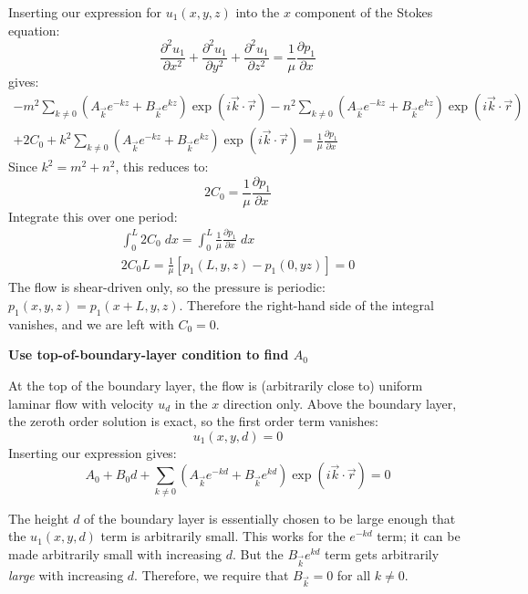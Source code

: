 \documentclass[12pt, a4paper, twoside, openright]{book}
\begin{document}
Inserting our expression for $u_1(x,y,z)$ into the $x$ component of the Stokes equation:
\begin{equation}
\frac{\partial^2 u_1}{\partial x^2} + \frac{\partial^2 u_1}{\partial y^2} +
\frac{\partial^2 u_1}{\partial z^2} =
\frac{1}{\mu} \frac{\partial p_1}{\partial x}
\end{equation}
gives:
\begin{multline}
- m^2
\sum_{k \neq 0} 
\left(  A_{\vec{k}} e^{-kz} + B_{\vec{k}} e^{kz} \right)
\exp(i \vec{k}\cdot \vec{r})
- n^2
\sum_{k \neq 0} 
\left(  A_{\vec{k}} e^{-kz} + B_{\vec{k}} e^{kz} \right)
\exp(i \vec{k}\cdot \vec{r}) \\
+ 2 C_0
+ k^2
\sum_{k \neq 0} 
\left(  A_{\vec{k}} e^{-kz} + B_{\vec{k}} e^{kz} \right)
\exp(i \vec{k}\cdot \vec{r})
= \frac{1}{\mu} \frac{\partial p_1}{\partial x}
\end{multline}
Since $k^2 = m^2 + n^2$, this reduces to:
\begin{equation}
2 C_0 = \frac{1}{\mu} \frac{\partial p_1}{\partial x}
\end{equation}
Integrate this over one period:
\begin{gather}
\int_0^L 2 C_0 \;dx = \int_0^L \frac{1}{\mu} \frac{\partial p_1}{\partial x} \;dx \\
2 C_0 L = \frac{1}{\mu} [ p_1(L,y,z) - p_1(0,yz) ] = 0
\end{gather}
The flow is shear-driven only, so the pressure is periodic: $p_1(x,y,z) = p_1(x+L,y,z)$.  Therefore the right-hand side of the integral vanishes, and we are left with $C_0 = 0$.

\vspace{1em}
\textbf{Use top-of-boundary-layer condition to find $A_0$}

At the top of the boundary layer, the flow is (arbitrarily close to) uniform laminar flow with velocity $u_d$ in the $x$ direction only.  Above the boundary layer, the zeroth order solution is exact, so the first order term vanishes:
\begin{equation}
u_1(x,y,d) = 0
\end{equation} 
Inserting our expression gives:
\begin{equation}
A_0 + B_0 d + \sum_{k \neq 0} 
\left(  A_{\vec{k}} e^{-kd} + B_{\vec{k}} e^{kd} \right)
\exp(i \vec{k}\cdot \vec{r})
= 0
\end{equation}

The height $d$ of the boundary layer is essentially chosen to be large enough that the $u_1(x,y,d)$ term is arbitrarily small.  This works for the $e^{-kd}$ term; it can be made arbitrarily small with increasing $d$.  But the $B_{\vec{k}} e^{kd}$ term gets arbitrarily \emph{large} with increasing $d$.  Therefore, we require that $B_{\vec{k}} = 0$ for all $k \neq 0$.
\end{document}
